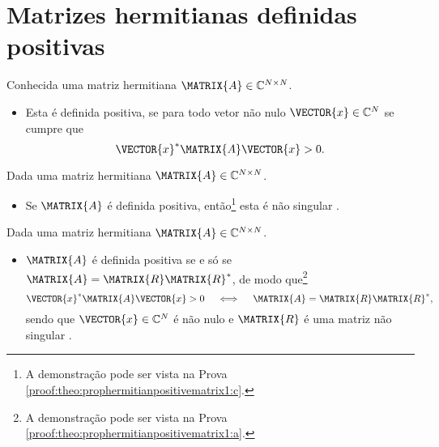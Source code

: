 \section{ Matrizes hermitianas definidas positivas}


\begin{definition}\label{def:hermitianapositivematrix0}
Conhecida uma matriz hermitiana $\MATRIX{A} \in \mathbb{C}^{N \times N}$. 
\begin{itemize}
\item Esta é definida positiva, se para todo vetor não nulo $\VECTOR{x} \in \mathbb{C}^N$
se cumpre que \cite[pp. 63]{ipsen2009numerical} 
\begin{equation}
\VECTOR{x}^{\ast} \MATRIX{A} \VECTOR{x} > 0.
\end{equation}
\end{itemize}
\end{definition}


\begin{theorem}\label{theo:prophermitianpositivematrix2}
Dada uma matriz hermitiana $\MATRIX{A} \in \mathbb{C}^{N \times N}$.
\begin{itemize}
\item Se $\MATRIX{A}$ é definida positiva, então\footnote{A
demonstração pode ser vista na Prova \ref{proof:theo:prophermitianpositivematrix1:c}.}  
esta é não singular \cite[pp. 63]{ipsen2009numerical}.
\end{itemize}
\end{theorem}
\begin{theorem}\label{theo:prophermitianpositivematrix0}
Dada uma matriz hermitiana $\MATRIX{A} \in \mathbb{C}^{N \times N}$.
\begin{itemize}
\item $\MATRIX{A}$ é definida positiva se e só se $\MATRIX{A}=\MATRIX{R}\MATRIX{R}^{\ast}$,
de modo que\footnote{A
demonstração pode ser vista na Prova \ref{proof:theo:prophermitianpositivematrix1:a}.}  
\begin{equation}
\VECTOR{x}^{\ast} \MATRIX{A} \VECTOR{x} > 0 \quad \iff \quad \MATRIX{A}=\MATRIX{R}\MATRIX{R}^{\ast},
\end{equation}
sendo que $\VECTOR{x} \in \mathbb{C}^{N}$ é não nulo e
$\MATRIX{R}$ é uma matriz não singular \cite[pp. 309]{hartfiel2000matrix}. %
\end{itemize}
\end{theorem}



